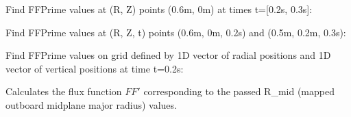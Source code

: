 \documentclass[letterpaper,10pt,english]{sphinxmanual}
\begin{document}
\begin{fulllineitems}
\begin{fulllineitems}
Find FFPrime values at (R, Z) points (0.6m, 0m) at times t={[}0.2s, 0.3s{]}:

\begin{sphinxVerbatim}[commandchars=\\\{\}]
    \PYG{p}{[} \PYG{p}{]}
\end{sphinxVerbatim}

Find FFPrime values at (R, Z, t) points (0.6m, 0m, 0.2s) and (0.5m, 0.2m, 0.3s):

\begin{sphinxVerbatim}[commandchars=\\\{\}]
  \PYG{p}{[} \PYG{p}{]} \PYG{p}{[} \PYG{p}{]} \PYG{p}{[} \PYG{p}{]} 
\end{sphinxVerbatim}

Find FFPrime values on grid defined by 1D vector of radial positions 
and 1D vector of vertical positions  at time t=0.2s:

\begin{sphinxVerbatim}[commandchars=\\\{\}]
     
\end{sphinxVerbatim}

\end{fulllineitems}


\begin{fulllineitems}
\label{\detokenize{eqtools:eqtools.core.Equilibrium.rmid2FFPrime}}
Calculates the flux function \(FF'\) corresponding to the passed R\_mid (mapped outboard midplane major radius) values.


\end{fulllineitems}
\end{fulllineitems}
\end{document}

